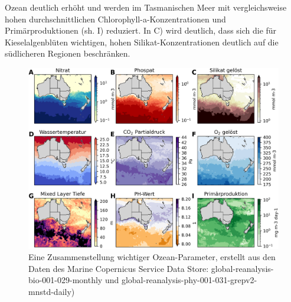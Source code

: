 \documentclass[12pt,a4paper,onecolumn]{scrartcl}
\begin{document}
Ozean deutlich erhöht und werden im Tasmanischen Meer mit vergleichsweise hohen durchschnittlichen Chlorophyll-a-Konzentrationen und Primärproduktionen (sh. I) reduziert. In C) wird deutlich, dass sich die für Kieselalgenblüten wichtigen, hohen Silikat-Konzentrationen deutlich auf die südlicheren Regionen beschränken.
\begin{figure}
\includegraphics[width=\textwidth]{bilder/factors_collage.png}
\caption{Eine Zusammenstellung wichtiger Ozean-Parameter, erstellt aus den Daten des Marine Copernicus Service Data Store: global-reanalysis-bio-001-029-monthly und global-reanalysis-phy-001-031-grepv2-mnstd-daily)} \label{fig:factors_collage}
\end{figure}
\end{document}
